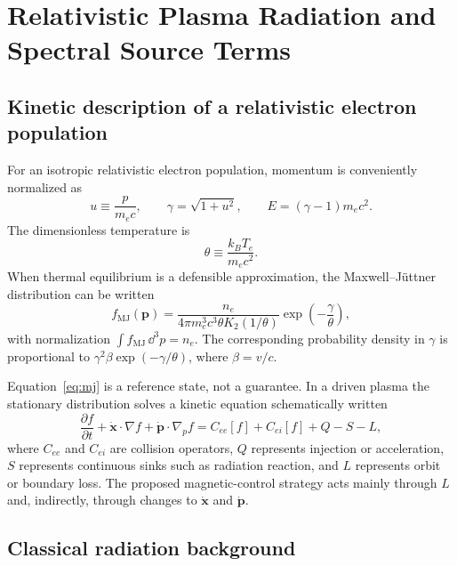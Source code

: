 \chapter{Relativistic Plasma Radiation and Spectral Source Terms}
\label{ch:plasma-radiation}

\section{Kinetic description of a relativistic electron population}

For an isotropic relativistic electron population, momentum is conveniently normalized as
\begin{equation}
 u \equiv \frac{p}{m_ec}, \qquad \gamma=\sqrt{1+u^2}, \qquad E=(\gamma-1)m_ec^2.
\end{equation}
The dimensionless temperature is
\begin{equation}
 \theta \equiv \frac{k_B T_e}{m_ec^2}.
\end{equation}
When thermal equilibrium is a defensible approximation, the Maxwell--J\"uttner distribution can be written
\begin{equation}
 f_{\mathrm{MJ}}(\mathbf{p})
 =\frac{n_e}{4\pi m_e^3c^3\theta K_2(1/\theta)}
 \exp\!\left(-\frac{\gamma}{\theta}\right),
\label{eq:mj}
\end{equation}
with normalization $\int f_{\mathrm{MJ}}\,\dd^3p=n_e$. The corresponding probability density in $\gamma$ is proportional to $\gamma^2\beta\exp(-\gamma/\theta)$, where $\beta=v/c$.

Equation~\eqref{eq:mj} is a reference state, not a guarantee. In a driven plasma the stationary distribution solves a kinetic equation schematically written
\begin{equation}
\frac{\partial f}{\partial t}
+\dot{\mathbf{x}}\cdot\nabla f
+\dot{\mathbf{p}}\cdot\nabla_p f
=C_{ee}[f]+C_{ei}[f]+Q-S-L,
\label{eq:kinetic-general}
\end{equation}
where $C_{ee}$ and $C_{ei}$ are collision operators, $Q$ represents injection or acceleration, $S$ represents continuous sinks such as radiation reaction, and $L$ represents orbit or boundary loss. The proposed magnetic-control strategy acts mainly through $L$ and, indirectly, through changes to $\dot{\mathbf{x}}$ and $\dot{\mathbf{p}}$.

\section{Classical radiation background}

